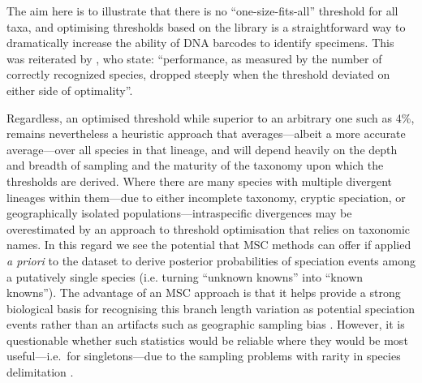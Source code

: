 \documentclass[12pt]{article}
\begin{document}

 The aim here is to illustrate that there is no ``one-size-fits-all'' threshold for all taxa, and optimising thresholds based on the library is a straightforward way to dramatically increase the ability of DNA barcodes to identify specimens. This was reiterated by \citep{Ratnasingham2013}, who state: ``performance, as measured by the number of correctly recognized species, dropped steeply when the threshold deviated on either side of optimality''.

Regardless, an optimised threshold while superior to an arbitrary one such as 4\%, remains nevertheless a heuristic approach that averages---albeit a more accurate average---over all species in that lineage, and will depend heavily on the depth and breadth of sampling and the maturity of the taxonomy upon which the thresholds are derived. Where there are many species with multiple divergent lineages within them---due to either incomplete taxonomy, cryptic speciation, or geographically isolated populations---intraspecific divergences may be overestimated by an approach to threshold optimisation that relies on taxonomic names. In this regard we see the potential that MSC methods can offer if applied \emph{a priori} to the dataset to derive posterior probabilities of speciation events among a putatively single species (i.e. turning ``unknown knowns'' into ``known knowns''). The advantage of an MSC approach is that it helps provide a strong biological basis for recognising this branch length variation as potential speciation events rather than an artifacts such as geographic sampling bias \citep{Bergsten2012}. However, it is questionable whether such statistics would be reliable where they would be most useful---i.e.\ for singletons---due to the sampling problems with rarity in species delimitation \citep{Lim2012}.
\end{document}
